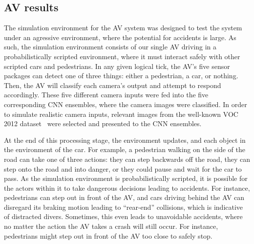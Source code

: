 \subsection{\acf{AV} results}

The simulation environment for the \ac{AV} system was designed to test the system under an agressive environment, where the potential for accidents is large.
As such, the simulation environment consists of our single \ac{AV} driving in a probabilistically scripted environment, where it must interact safely with other scripted cars and pedestrians.
In any given logical tick, the \ac{AV}'s five sensor packages can detect one of three things: either a pedestrian, a car, or nothing.
Then, the \ac{AV} will classify each camera's output and attempt to respond accordingly.
These five different camera inputs were fed into the five corresponding \ac{CNN} ensembles, where the camera images were classified.
In order to simulate realistic camera inputs, relevant images from the well-known \acf{VOC} 2012 dataset~\cite{pascal-voc-2012} were selected and presented to the \ac{CNN} ensembles. 

At the end of this processing stage, the environment updates, and each object in the environment of the car.
For example, a pedestrian walking on the side of the road can take one of three actions: they can step backwards off the road, they can step onto the road and into danger, 
or they could pause and wait for the car to pass.
As the simulation environment is probabilistically scripted, it is possible for the actors within it to take dangerous decisions leading to accidents.
For instance, pedestrians can step out in front of the \ac{AV}, and cars driving behind the \ac{AV} can disregard its braking motion leading to ``rear-end'' collisions, which is indicative of distracted divers. 
Sometimes, this even leads to unavoidable accidents, where no matter the action the \ac{AV} takes a crash will still occur.
For instance, pedestrians might step out in front of the \ac{AV} too close to safely stop.

